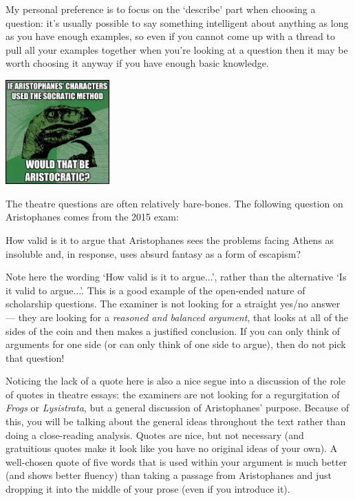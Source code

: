 \documentclass[a4paper,10pt]{article}
\begin{document}
My personal preference is to focus on the `describe' part when choosing a question: it's usually possible to say something intelligent
about anything as long as you have enough examples, so even if you cannot come up with a thread to pull all your examples together
when you're looking at a question then it may be worth choosing it anyway if you have enough basic knowledge.

\begin{center}
  \includegraphics[width=0.3\textwidth]{aris}
\end{center}

The theatre questions are often relatively bare-bones. The following question on Aristophanes comes from the 2015 exam:
\begin{mdframed}
  How valid is it to argue that Aristophanes sees the problems facing Athens as insoluble and, in response,
  uses absurd fantasy as a form of escapism?
\end{mdframed}

Note here the wording `How valid is it to argue...', rather than the alternative `Is it valid to argue...'. This is a good example
of the open-ended nature of scholarship questions. The examiner is not looking for a straight yes/no answer --- they are looking
for a \emph{reasoned and balanced argument}, that looks at all of the sides of the coin and then makes a justified conclusion. If
you can only think of arguments for one side (or can only think of one side to argue), then do not pick that question!

Noticing the lack of a quote here is also a nice segue into a discussion of the role of quotes in theatre essays: the examiners
are not looking for a regurgitation of \textit{Frogs} or \textit{Lysistrata}, but a general discussion of Aristophanes' purpose.
Because of this, you will be talking about the general ideas throughout the text rather than doing a close-reading analysis. Quotes
are nice, but not necessary (and gratuitious quotes make it look like you have no original ideas of your own). A well-chosen
quote of five words that is used within your argument is much better (and shows better fluency) than taking a passage from Aristophanes
and just dropping it into the middle of your prose (even if you introduce it).
\end{document}
